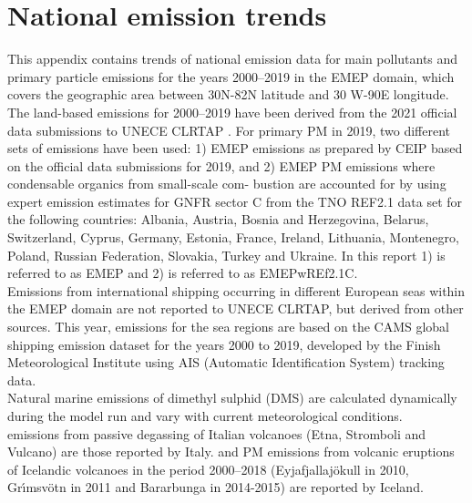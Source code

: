\setcounter{page}{1}

\cleardoublepage
\chapter[Emission trends]{National emission trends}
\label{ch:appx_emis_trends}


This appendix contains trends of national emission data for main
pollutants and   primary particle emissions for the years
2000--2019 in the EMEP domain, which covers the geographic area between 30\degrees N-82\degrees N latitude and 30\degrees   
W-90\degrees E longitude.\\

The land-based emissions for 2000--2019  have been derived from the  2021 official data submissions to UNECE CLRTAP \citep{CEIP2021}.
For primary PM in 2019, two different sets of emissions have been used: 1) EMEP emissions as prepared by CEIP based on the official data submissions
for 2019, and 2) EMEP PM emissions where condensable organics from small-scale com-
bustion are accounted for by using expert emission estimates for GNFR sector C from the
TNO REF2.1 data set for the following countries: Albania, Austria, Bosnia and Herzegovina,
Belarus, Switzerland, Cyprus, Germany, Estonia, France, Ireland, Lithuania, Montenegro,
Poland, Russian Federation, Slovakia, Turkey and Ukraine. In this report 1) is referred to as EMEP and 2) is referred to as EMEPwREf2.1C.\\

Emissions from international shipping occurring in different European seas within the EMEP domain are not reported to UNECE CLRTAP, but derived from other sources. This year, emissions for the sea regions are based on the CAMS global shipping emission dataset \citep{CAMSemis2019,ECCAD} for the years 2000 to 2019, developed by the Finish Meteorological Institute using AIS (Automatic Identification System) tracking data.\\

Natural marine emissions of dimethyl sulphid (DMS) are calculated dynamically during the model run and vary with current meteorological conditions.\\

\sox emissions from passive degassing of Italian volcanoes (Etna,
Stromboli and Vulcano) are those reported by
Italy. \sox and PM emissions from volcanic eruptions of Icelandic volcanoes in the period 2000--2018 (Eyjafjallaj\"okull in 2010, Gr{\'{\i}}msv{\"{o}}tn in 2011  and  Bar\dh{}arbunga in 2014-2015) are reported by Iceland.  \\


